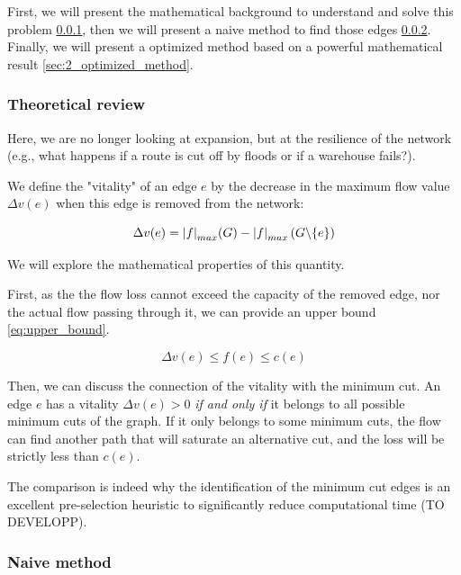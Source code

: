 \documentclass[12pt, openany]{article}
\begin{document}
First, we will present the mathematical background to understand and solve this problem \ref{sec:2_theoretical_review}, then we will present a naive method to find those edges \ref{sec:2_naive_method}. Finally, we will present a optimized method based on a powerful mathematical result \ref{sec:2_optimized_method}.

\subsubsection{Theoretical review}\label{sec:2_theoretical_review}

Here, we are no longer looking at expansion, but at the resilience of the network (e.g., what happens if a route is cut off by floods or if a warehouse fails?).

We define the "vitality" of an edge $e$ by the decrease in the maximum flow value $\Delta v(e)$ when this edge is removed from the network:

\begin{equation}
    \Delta v(e) = \abs{f}_{max}(G) - \abs{f}_{max}\left(G \backslash\{e\}\right)
\end{equation}

We will explore the mathematical properties of this quantity.

First, as the the flow loss cannot exceed the capacity of the removed edge, nor the actual flow passing through it, we can provide an upper bound \eqref{eq:upper_bound}.

\begin{equation}\label{eq:upper_bound}
    \Delta v(e) \leq f(e) \leq c(e)
\end{equation}

Then, we can discuss the connection of the vitality with the minimum cut. An edge $e$ has a vitality $\Delta v(e) > 0$ \textit{if and only if} it belongs to all possible minimum cuts of the graph. If it only belongs to some minimum cuts, the flow can find another path that will saturate an alternative cut, and the loss will be strictly less than $c(e)$.

The comparison is indeed why the identification of the minimum cut edges is an excellent pre-selection heuristic to significantly reduce computational time (TO DEVELOPP).

\subsubsection{Naive method}\label{sec:2_naive_method}
\end{document}
